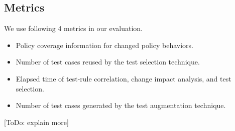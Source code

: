 \begin{itemize}
%	
%	
	
\end{itemize}

\subsection{Metrics}

We use following 4 metrics in our evaluation.
\begin{itemize}
	\item Policy coverage information for changed policy behaviors.
	\item Number of test cases reused by the test selection technique.
	\item Elapsed time of test-rule correlation, change impact analysis, and test selection.
	\item Number of test cases generated by the test augmentation technique. 
\end{itemize}
	
[ToDo: explain more]








